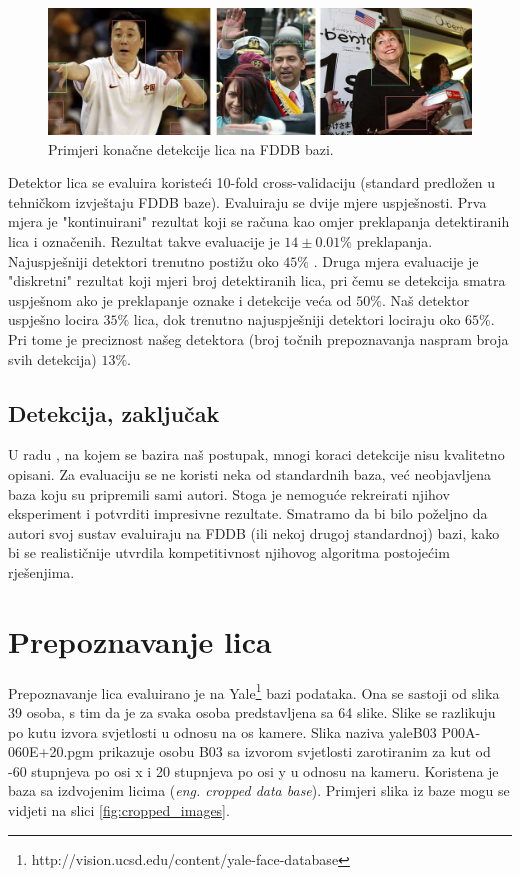 \documentclass[times, utf8, seminar, numeric]{fer}
\begin{document}
\begin{figure}[!htb]
\centering
\includegraphics[width=\textwidth]{raw/fddb_bboxes.jpg}
\caption{Primjeri konačne detekcije lica na FDDB bazi.}
\label{fig:fddb_bboxes}
\end{figure}

Detektor lica se evaluira koristeći 10-fold cross-validaciju (standard predložen
u tehničkom izvještaju FDDB baze). Evaluiraju se dvije mjere uspješnosti. Prva mjera
je "kontinuirani" rezultat koji se računa kao omjer preklapanja detektiranih lica
i označenih. Rezultat takve evaluacije je $14 \pm 0.01\%$ preklapanja. Najuspješniji
detektori trenutno postižu oko $45\%$ \cite{fddbTech}. Druga mjera evaluacije je "diskretni" rezultat
koji mjeri broj detektiranih lica, pri čemu se detekcija smatra uspješnom ako je preklapanje
oznake i detekcije veća od $50\%$. Naš detektor uspješno locira $35\%$ lica, dok trenutno
najuspješniji detektori lociraju oko $65\%$. Pri tome je preciznost našeg detektora
(broj točnih prepoznavanja naspram broja svih detekcija) $13\%$.

\subsection{Detekcija, zaključak}

U radu \cite{conf/isda/ChandrappaR12}, na kojem se bazira naš postupak, mnogi koraci detekcije nisu kvalitetno
opisani. Za evaluaciju se ne koristi neka od standardnih baza,
već neobjavljena baza koju su pripremili sami autori. Stoga je nemoguće
rekreirati njihov eksperiment i potvrditi impresivne rezultate. Smatramo da bi bilo poželjno
da autori svoj sustav evaluiraju na FDDB (ili nekoj drugoj standardnoj) bazi, kako bi se realističnije
utvrdila kompetitivnost njihovog algoritma postojećim rješenjima.

\section{Prepoznavanje lica}

Prepoznavanje lica evaluirano je na Yale\footnote{http://vision.ucsd.edu/content/yale-face-database} bazi podataka. Ona se sastoji od slika 39 osoba, s tim da je za svaka osoba predstavljena sa 64 slike. Slike se razlikuju po kutu izvora svjetlosti u odnosu na os kamere. Slika naziva yaleB03 \textunderscore P00A-060E+20.pgm prikazuje osobu B03 sa izvorom svjetlosti zarotiranim za kut od -60 stupnjeva po osi x i 20 stupnjeva po osi y u odnosu na kameru. Koristena je baza sa izdvojenim licima (\textit{eng. cropped data base}). Primjeri slika iz baze mogu se vidjeti na slici \ref{fig:cropped_images}. 
\end{document}
